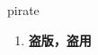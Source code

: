 
\begin{frame}
{\huge pirate}
\begin{center}
\begin{enumerate}\Large
  \item \textbf{盗版，盗用}
\end{enumerate}
\end{center}
\end{frame}
